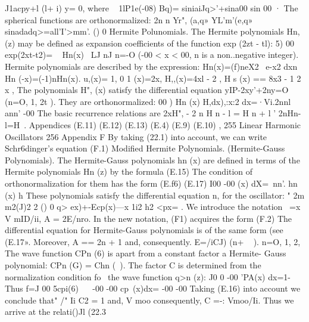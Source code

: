 \documentclass[a4paper,sfsidenotes,colorlinks=true]{tufte-book}
\numberwithin{equation}{section}
\numberwithin{figure}{section}
\begin{document}
{{{{{{{J1acpy+l (l+ i) y= 0,
where
~ 1lP1e(-08) Bq)= siniaiJq>'+sina00 sin 00 ·
The spherical functions are orthonormalized: 2n n
Yr", (a,q» YL'm'(e,q» sinadadq>=all'I'>mm'.
() 0
Hermite Polunomials. The Hermite polynomials Hn,(z) may be defined as expansion coefficients of the function exp (2zt - tl):
5)
00
exp(2xt-t2)= ~ Hn(x)~ LJ	nJ
n=-O
(-00 < x < 00, n is a non..negative integer). Hermite polynomials are described by the expression:
Hn(x)=(f)neX2 ~e-x2 dxn 
Hn (-x)=(-1)nHn(x). u,(x)= 1, 0 1 (x)=2x, H,,(x)=4xl - 2 ,
H s (x) == 8x3 - 1 2 x , The polynomials H", (x) satisfy the differential equation
yIP-2xy'+2ny=O (n=O, 1, 2t ).
They are orthonormalized: 00
) Hn (x) H,dx),:x:2 dx=·Vi.2nnl ann'  -00
The basic recurrence relations are 2xH", - 2 n H n - l = H n + l ' 2nHn-l=H~.
Appendices
(E.11)
(E.12)
(E.13)
(E.4)
(E.9)
(E.10)
, 255
Linear Harmonic Oscillators
256
Appendix F By taking (22.1) into account, we can write Schr6dinger's equation
(F.1)
Modified Hermite Polynomials. (Hermite-Gauss Polynomials). The Hermite-Gauss polynomials hn (x) are defined in terms of the Hermite polynomials Hn (z) by the formula
(E.15) The condition of orthonormalization for them has the form
(E.f6)
(E.17)
I00 -00
(x) dX=~nn'.
hn (x) h These polynomials satisfy the differential equation
n,
for the oscillator: "	2m	m2(J)2 2 () 0
q> ex)+-Ecp(x)---x 1i2 h2
<px= .
We introduce the notation
~=x V mID/ii,	A = 2E/nro. In the new notation, (F1) acquires the form
(F.2) The differential equation for Hermite-Gauss polynomials is of the
same form (see (E.17». Moreover, A == 2n + 1 and, consequently. E=/iCJ) (n+ ~ ). n=O, 1, 2,
The wave function CPn (6) is apart from a constant factor a Hermite- Gauss polynomial:
CPn (G) = Chn (~). The factor C is determined from the normalization condition fo~
the wave function q>n (z):
J0 0 -00
'PA(x) dx=1-
Thus f=J
00
5cpi(6) ~~ -00 -00
cp~(x)dx=
-00 -00 Taking (E.16) into account we conclude that" /" Ii C2 = 1 and,
V moo consequently, C =-: Vmoo/Ii. Thus we arrive at the relati()Jl (22.3~

}}}}}}}
\end{document}

